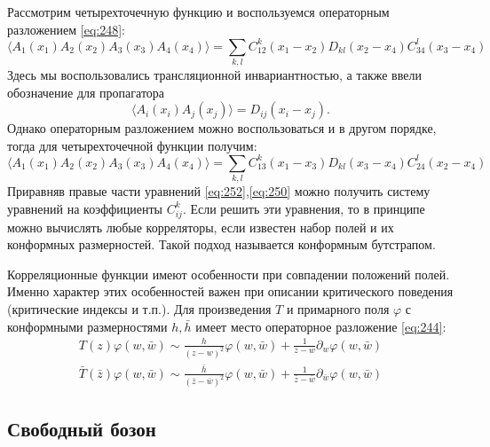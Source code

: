 \documentclass[a4paper,12pt]{article} \usepackage[utf8x]{inputenc} \usepackage[russian]{babel}
\theoremstyle{definition} \newtheorem{corollary}{Corollary}[theorem] \theoremstyle{definition}
\begin{document}
Рассмотрим четырехточечную функцию и воспользуемся операторным разложением \eqref{eq:248}:
\begin{equation}
  \label{eq:250} \langle A_{1}(x_{1}) A_{2}(x_{2}) A_{3}(x_{3}) A_{4}(x_{4}) \rangle =\sum_{k,l}
C^{k}_{12} (x_{1}-x_{2}) D_{kl}(x_{2}-x_{4}) C^{l}_{34}(x_{3}-x_{4})
\end{equation} Здесь мы воспользовались трансляционной инвариантностью, а также ввели обозначение
для пропагатора
\begin{equation}
  \label{eq:251} \langle A_{i}(x_{i}) A_{j}(x_{j}) \rangle =D_{ij}(x_{i}-x_{j}).
\end{equation} Однако операторным разложением можно воспользоваться и в другом порядке, тогда для
четырехточечной функции получим:
\begin{equation}
  \label{eq:252} \langle A_{1}(x_{1}) A_{2}(x_{2}) A_{3}(x_{3}) A_{4}(x_{4}) \rangle =\sum_{k,l}
C^{k}_{13} (x_{1}-x_{3}) D_{kl}(x_{3}-x_{4}) C^{l}_{24}(x_{2}-x_{4})
\end{equation} Приравняв правые части уравнений \eqref{eq:252},\eqref{eq:250} можно получить систему
уравнений на коэффициенты $C^{k}_{ij}$. Если решить эти уравнения, то в принципе можно вычислять
любые корреляторы, если известен набор полей и их конформных размерностей. Такой подход называется
конформным бутстрапом.

Корреляционные функции имеют особенности при совпадении положений полей. Именно характер этих
особенностей важен при описании критического поведения (критические индексы и т.п.). Для
произведения $T$ и примарного поля $\varphi$ с конформными размерностями $h,\bar h$ имеет место
операторное разложение \eqref{eq:244}:
\begin{eqnarray}
  \label{eq:253} T(z) \varphi(w,\bar w)\sim \frac{h}{(z-w)^{2}} \varphi(w,\bar
w)+\frac{1}{z-w} \partial_{w} \varphi(w,\bar w)\\ \bar T(\bar z) \varphi(w,\bar w)\sim \frac{\bar
h}{(\bar z-\bar w)^{2}} \varphi(w,\bar w)+\frac{1}{\bar z-\bar w} \partial_{\bar w} \varphi(w,\bar
w)
\end{eqnarray}

\subsection{Свободный бозон}
\label{sec:free-boson}
\end{document}
